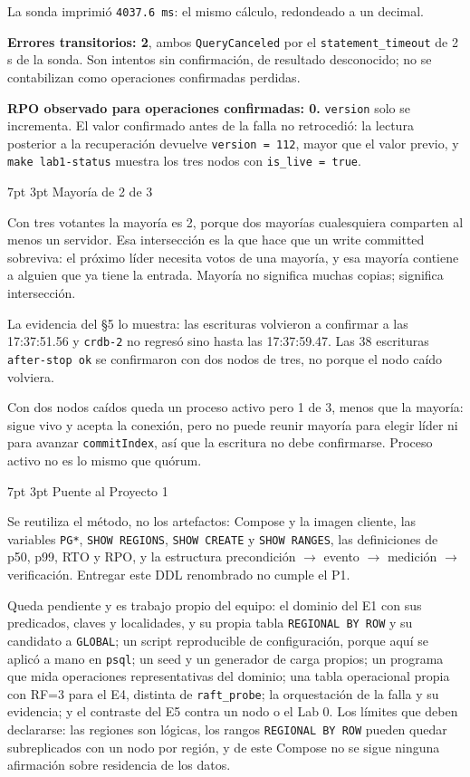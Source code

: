 \documentclass[10pt,letterpaper]{article}
\makeatletter
\renewcommand\section{\@startsection{section}{1}{\z@}%
  {7pt \@plus 2pt \@minus 1pt}{3pt}%
  {\normalfont\normalsize\bfseries\color{acc}}}
\makeatother
\begin{document}
La sonda imprimió \texttt{4037.6 ms}: el mismo cálculo, redondeado a un decimal.

\textbf{Errores transitorios: 2}, ambos \texttt{QueryCanceled} por el \texttt{statement\_timeout}
de 2 s de la sonda. Son intentos sin confirmación, de resultado desconocido; no se contabilizan
como operaciones confirmadas perdidas.

\textbf{RPO observado para operaciones confirmadas: 0.} \texttt{version} solo se incrementa. El
valor confirmado antes de la falla no retrocedió: la lectura posterior a la recuperación devuelve
\texttt{version = 112}, mayor que el valor previo, y \texttt{make lab1-status} muestra los tres
nodos con \texttt{is\_live = true}.

\section{Mayoría de 2 de 3}

Con tres votantes la mayoría es 2, porque dos mayorías cualesquiera comparten al menos un servidor.
Esa intersección es la que hace que un write committed sobreviva: el próximo líder necesita votos de
una mayoría, y esa mayoría contiene a alguien que ya tiene la entrada. Mayoría no significa muchas
copias; significa intersección.

La evidencia del §5 lo muestra: las escrituras volvieron a confirmar a las 17:37:51.56 y
\texttt{crdb-2} no regresó sino hasta las 17:37:59.47. Las 38 escrituras \texttt{after-stop ok} se
confirmaron con dos nodos de tres, no porque el nodo caído volviera.

Con dos nodos caídos queda un proceso activo pero 1 de 3, menos que la mayoría: sigue vivo y acepta
la conexión, pero no puede reunir mayoría para elegir líder ni para avanzar \texttt{commitIndex}, así
que la escritura no debe confirmarse. Proceso activo no es lo mismo que quórum.

\section{Puente al Proyecto 1}

Se reutiliza el método, no los artefactos: Compose y la imagen cliente, las variables \texttt{PG*},
\texttt{SHOW REGIONS}, \texttt{SHOW CREATE} y \texttt{SHOW RANGES}, las definiciones de p50, p99,
RTO y RPO, y la estructura precondición $\rightarrow$ evento $\rightarrow$ medición $\rightarrow$
verificación. Entregar este DDL renombrado no cumple el P1.

Queda pendiente y es trabajo propio del equipo: el dominio del E1 con sus predicados, claves y
localidades, y su propia tabla \texttt{REGIONAL BY ROW} y su candidato a \texttt{GLOBAL}; un script
reproducible de configuración, porque aquí se aplicó a mano en \texttt{psql}; un seed y un generador
de carga propios; un programa que mida operaciones representativas del dominio; una tabla operacional
propia con RF=3 para el E4, distinta de \texttt{raft\_probe}; la orquestación de la falla y su
evidencia; y el contraste del E5 contra un nodo o el Lab 0. Los límites que deben declararse: las
regiones son lógicas, los rangos \texttt{REGIONAL BY ROW} pueden quedar subreplicados con un nodo por
región, y de este Compose no se sigue ninguna afirmación sobre residencia de los datos.
\end{document}
